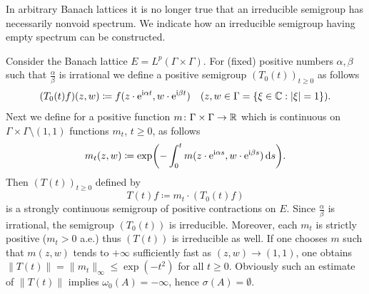 In arbitrary Banach lattices it is no longer true that an irreducible semigroup has necessarily nonvoid spectrum.
We indicate how an irreducible semigroup having empty spectrum can be constructed.
\begin{example}\label{ex:c3-3.6}

Consider the Banach lattice $E = L^{p}(\Gamma\times\Gamma)$.
For (fixed) positive numbers $\alpha,\beta$ such that $\frac{\alpha}{\beta}$ is irrational we define a positive semigroup $(T_{0}(t))_{t\geq 0}$ as follows
\begin{equation}\label{eq:c3-3.9}
	(T_{0}(t)f)(z,w) \coloneq f(z\cdot \mathrm{e}^{\mathrm{i}\alpha t},w\cdot \mathrm{e}^{\mathrm{i}\beta t}) \quad (z,w \in \Gamma = \{\xi\in\mathbb{C} :|\xi|=1\}) .
\end{equation}
Next we define for a positive function $m \colon \Gamma\times\Gamma \to \mathbb{R} $ which is continuous on $\Gamma\times\Gamma\setminus(1,1)$ functions $m_{t}$, $t\geq 0$, as follows
\begin{equation}\label{eq:c3-3.10}
	m_{t}(z,w) \coloneq \exp\mleft(-\int_{0}^{t} m(z\cdot \eu^{\im\alpha s},w\cdot \eu^{\im\beta s})\ds \mright) .
\end{equation}
Then $(T(t))_{t\geq 0}$ defined by
\begin{equation}\label{eq:c3-3.11}
	T(t)f \coloneq m_{t}\cdot(T_{0}(t)f)
\end{equation}
is a strongly continuous semigroup of positive contractions on $E$.
Since $\frac{\alpha}{\beta}$ is irrational, the semigroup $(T_{0}(t))$ is irreducible.
Moreover, each $m_{t}$ is strictly positive (\ie  $m_{t} > 0$ a.e.) thus $(T(t))$ is irreducible as well.
If one chooses $m$ such that $m(z,w)$ tends to $+\infty$ sufficiently fast as $(z,w) \to (1,1)$, one obtains $\|T(t)\| = \|m_{t}\|_{\infty} \leq \exp(-t^{2})$ for all $t \geq 0$.
Obviously such an estimate of\/ $\|T(t)\|$ implies $\omega_0(A) = -\infty$, hence $\sigma(A) = \emptyset$.
\end{example}
